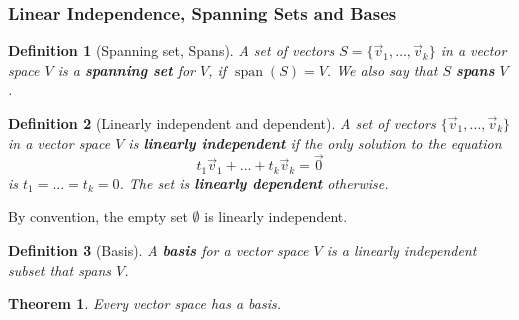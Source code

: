 \documentclass[10pt]{article}
\DeclareMathOperator{\spn}{span}
\theoremstyle{break}
\newtheorem{thm}{Theorem}[subsection]
\newtheorem{defn}{Definition}[subsection]
\begin{document}
\subsubsection*{Linear Independence, Spanning Sets and Bases}
\begin{defn}[Spanning set, Spans]
    A set of vectors $S = \{\vec{v}_1, \dots, \vec{v}_k\}$ in a vector space $V$ is a \textbf{spanning set} for $V$, if $\spn(S)  = V$. We also say that $S$ \textbf{spans} $V$.
\end{defn}
\begin{defn}[Linearly independent and dependent]
    A set of vectors $\{\vec{v}_1, \dots, \vec{v}_k\}$ in a vector space $V$ is \textbf{linearly independent} if the only solution to the equation $$t_1\vec{v}_1 + \dots + t_k\vec{v}_k = \vec{0}$$
    is $t_1 = \dots = t_k = 0$. The set is \textbf{linearly dependent} otherwise.
\end{defn}
By convention, the empty set $\emptyset$ is linearly independent.
\begin{defn}[Basis]
    A \textbf{basis} for a vector space $V$ is a linearly independent subset that spans $V$.
\end{defn}
\begin{thm}
    Every vector space  has a basis.
\end{thm}
\end{document}
